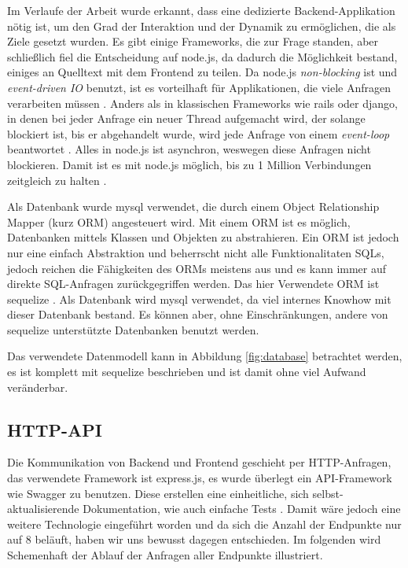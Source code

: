 \documentclass[12pt,twoside]{book}
\begin{document}
Im Verlaufe der Arbeit wurde erkannt, dass eine dedizierte Backend-Applikation nötig ist, um den Grad der Interaktion und der Dynamik zu ermöglichen, die als Ziele gesetzt wurden. Es gibt einige Frameworks, die zur Frage standen, aber schließlich fiel die Entscheidung auf node.js, da dadurch die Möglichkeit bestand, einiges an Quelltext mit dem Frontend zu teilen. Da node.js \textit{non-blocking} ist und \textit{event-driven IO} benutzt, ist es vorteilhaft für Applikationen, die viele Anfragen verarbeiten müssen \citep{tilkov2010node}. Anders als in klassischen Frameworks wie rails oder django, in denen bei jeder Anfrage ein neuer Thread aufgemacht wird, der solange blockiert ist, bis er abgehandelt wurde, wird jede Anfrage von einem \textit{event-loop} beantwortet \citep{tilkov2010node}. Alles in node.js ist asynchron, weswegen diese Anfragen nicht blockieren. Damit ist es mit node.js möglich, bis zu 1 Million Verbindungen zeitgleich zu halten \cite{node1m}.

Als Datenbank wurde mysql verwendet, die durch einem Object Relationship Mapper (kurz ORM) angesteuert wird. Mit einem ORM ist es möglich, Datenbanken mittels Klassen und Objekten zu abstrahieren. Ein ORM ist jedoch nur eine einfach Abstraktion und beherrscht nicht alle Funktionalitaten SQLs, jedoch reichen die Fähigkeiten des ORMs meistens aus und es kann immer auf direkte SQL-Anfragen zurückgegriffen werden. Das hier Verwendete ORM ist sequelize \cite{sequelize}. Als Datenbank wird mysql verwendet, da viel internes Knowhow mit dieser Datenbank bestand. Es können aber, ohne Einschränkungen, andere von sequelize unterstützte Datenbanken benutzt werden.

Das verwendete Datenmodell kann in Abbildung \ref{fig:database} betrachtet werden, es ist komplett mit sequelize beschrieben und ist damit ohne viel Aufwand veränderbar.

\subsection{HTTP-API}

Die Kommunikation von Backend und Frontend geschieht per HTTP-Anfragen, das verwendete Framework ist express.js, es wurde überlegt ein API-Framework wie Swagger \cite{swagger} zu benutzen. Diese erstellen eine einheitliche, sich selbst-aktualisierende Dokumentation, wie auch einfache Tests \cite{haupt2014model}.
Damit wäre jedoch eine weitere Technologie eingeführt worden und da sich die Anzahl der Endpunkte nur auf 8 beläuft, haben wir uns bewusst dagegen entschieden. Im folgenden wird Schemenhaft der Ablauf der Anfragen aller Endpunkte illustriert.
\end{document}
